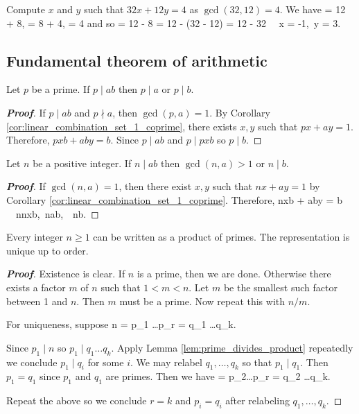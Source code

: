 \begin{example}
Compute $x$ and $y$ such that $32x + 12y = 4$ as $\gcd(32,12) = 4$. We have
 = 12 + 8,  = 8 + 4, = 4 
\ee
and so 
 = 12 - 8 = 12 - (32 - 12) = 12 - 32 \ \ra\ x = -1,\ y = 3.
\ee
\end{example}

\subsection{Fundamental theorem of arithmetic}

\begin{lemma}\label{lem:prime_divides_product}
Let $p$ be a prime. If $p\mid ab$ then $p\mid a$ or $p\mid b$.
\end{lemma}

\begin{proof}[\bf Proof]
If $p\mid ab$ and $p\nmid a$, then $\gcd(p,a) = 1$. By Corollary \ref{cor:linear_combination_set_1_coprime}, there exists $x,y$ such that $px + ay =1$. Therefore, $pxb + aby = b$. Since $p\mid ab$ and $p\mid pxb$ so $p\mid b$. 
\end{proof}

\begin{lemma}\label{lem:integer_divides_product}
Let $n$ be a positive integer. If $n\mid ab$ then $\gcd(n,a)>1$ or $n\mid b$.
\end{lemma}

\begin{proof}[\bf Proof]
If $\gcd(n,a) = 1$, then there exist $x,y$ such that $nx+ay = 1$ by Corollary \ref{cor:linear_combination_set_1_coprime}. Therefore, 
\be
nxb + aby = b \ \ra\ n\mid nxb,\ n\mid ab,\ \ra\ n\mid b.
\ee
\end{proof}

\begin{theorem}\label{thm:fundamental_theorem_arithmetic}
Every integer $n\geq 1$ can be written as a product of primes. The representation is unique up to order.
\end{theorem}

\begin{proof}[\bf Proof]
Existence is clear. If $n$ is a prime, then we are done. Otherwise there exists a factor $m$ of $n$ such that $1<m<n$. Let $m$ be the smallest such factor between 1 and $n$. Then $m$ must be a prime. Now repeat this with $n/m$.

For uniqueness, suppose
\be
n = p_1 \dots p_r = q_1 \dots q_k.
\ee

Since $p_1\mid n$ so $p_1 \mid q_1\dots q_k$. Apply Lemma \ref{lem:prime_divides_product} repeatedly we conclude $p_1\mid q_i$ for some $i$. We may relabel $q_1,\dots,q_k$ so that $p_1\mid q_1$. Then $p_1 = q_1$ since $p_1$ and $q_1$ are primes. Then we have
\be
{} = p_2\dots p_r = q_2 \dots q_k.
\ee

Repeat the above so we conclude $r=k$ and $p_i = q_i$ after relabeling $q_1,\dots,q_k$.
\end{proof}

